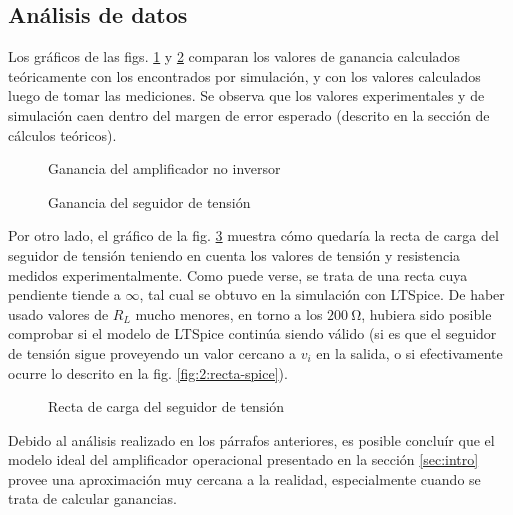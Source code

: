\subsection{Análisis de datos}

Los gráficos de las figs. \ref{fig:2-analisis:ganancia-opamp} y 
\ref{fig:2-analisis:ganancia-seguidor} comparan los valores
de ganancia calculados teóricamente con los encontrados por simulación, y con
los valores calculados luego de tomar las mediciones. Se observa que los
valores experimentales y de simulación caen dentro del margen de error
esperado (descrito en la sección de cálculos teóricos).

\begin{figure}[H]
    \centering
    
    \caption{Ganancia del amplificador no inversor}
    \label{fig:2-analisis:ganancia-opamp}
\end{figure}

\begin{figure}[H]
    \centering
    
    \caption{Ganancia del seguidor de tensión}
    \label{fig:2-analisis:ganancia-seguidor}
\end{figure}

Por otro lado, el gráfico de la fig. \ref{fig:2-analisis:recta-carga} muestra
cómo quedaría la recta de carga del seguidor de tensión teniendo en cuenta
los valores de tensión y resistencia medidos experimentalmente. Como puede
verse, se trata de una recta cuya pendiente tiende a $\infty$, tal cual se
obtuvo en la simulación con LTSpice. De haber usado valores de $R_L$ mucho
menores, en torno a los $\SI{200}{\ohm}$, hubiera sido posible comprobar si
el modelo de LTSpice continúa siendo válido (si es que el seguidor de
tensión sigue proveyendo un valor cercano a $v_i$ en la salida, o si
efectivamente ocurre lo descrito en la fig. \ref{fig:2:recta-spice}).

\begin{figure}[H]
    \centering
    
    \caption{Recta de carga del seguidor de tensión}
    \label{fig:2-analisis:recta-carga}
\end{figure}

Debido al análisis realizado en los párrafos anteriores, es posible concluír
que el modelo ideal del amplificador operacional presentado en la sección
\ref{sec:intro} provee una aproximación muy cercana a la realidad, 
especialmente cuando se trata de calcular ganancias.
